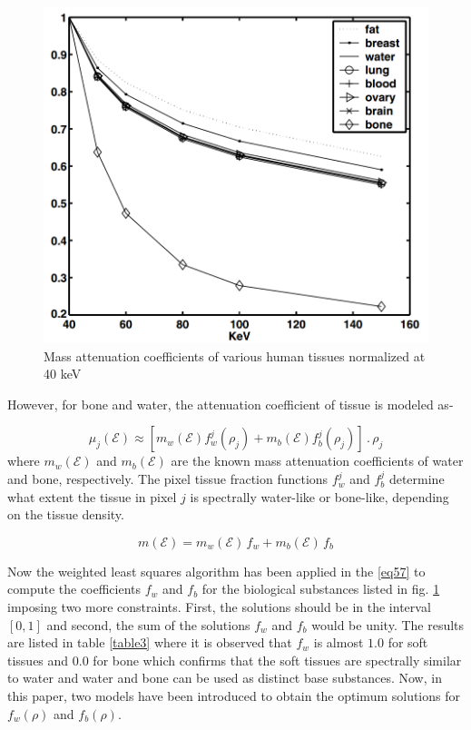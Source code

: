 \begin{figure}
\centering
\includegraphics[width=3 in]{"mac_table"}
\caption{Mass attenuation coefficients of various human tissues normalized at 40 keV}
\label{fesmactable}
\end{figure}

However, for bone and water, the attenuation coefficient of tissue is modeled as-

\begin{equation}
\label{eq57}
\mu_j(\mathcal{E}) \approx \left[ m_w(\mathcal{E}) f_{w}^{j}(\rho_j) + m_b(\mathcal{E}) f_{b}^{j}(\rho_j) \right] \, . \,\rho_j 
\end{equation} where $m_w(\mathcal{E})$ and $m_b(\mathcal{E})$ are the known mass attenuation coefficients of water and bone, respectively. The pixel tissue fraction functions $f_w^{j}$ and $f_b^{j}$ determine what extent the tissue in pixel $j$ is spectrally water-like or bone-like, depending on the tissue density. 


\begin{equation}
\label{eq58}
m(\mathcal{E}) = m_w(\mathcal{E})\,f_w + m_b(\mathcal{E})\,f_b
\end{equation}  

Now the weighted least squares algorithm has been applied in the \ref{eq57} to compute the coefficients $f_w$ and $f_b$ for the biological substances listed in fig. \ref{fesmactable} imposing two more constraints. First, the solutions should be in the interval $[0,1]$ and second, the sum of the solutions $f_w$ and $f_b$ would be unity. The results are listed in table \ref{table3} where it is observed that $f_w$ is almost $1.0$ for soft tissues and $0.0$ for bone which confirms that the soft tissues are spectrally similar to water and water and bone can be used as distinct base substances. Now, in this paper, two models have been introduced to obtain the optimum solutions for $f_w(\rho)$ and $f_b(\rho)$.


